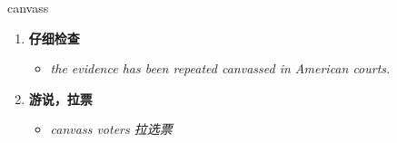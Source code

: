 
\begin{frame}
{\huge canvass}
\begin{center}
\begin{enumerate}\Large
  \item \textbf{仔细检查}
  \begin{itemize}
    \item \em{\Large{the evidence has been repeated canvassed in American courts.}}
  \end{itemize}
  \item \textbf{游说，拉票}
  \begin{itemize}
    \item \em{\Large{canvass voters 拉选票}}
  \end{itemize}
\end{enumerate}
\end{center}
\end{frame}
